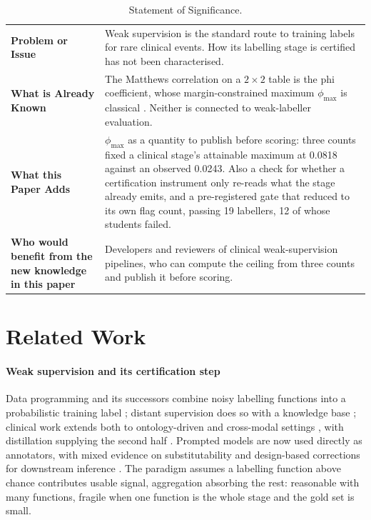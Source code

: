 \documentclass[review]{elsarticle}
\begin{document}
\begin{table}[H]
\centering
\caption{Statement of Significance.}
\label{tab:significance}
\footnotesize
\begin{tabular}{@{}p{}p{}@{}}
\hline
\textbf{Problem or Issue} & Weak supervision is the standard route to training labels for rare clinical events. How its labelling stage is certified has not been characterised. \\[4pt]

\textbf{What is Already Known} & The Matthews correlation on a $2\times2$ table is the phi coefficient, whose margin-constrained maximum $\phi_{\max}$ is classical \cite{cureton1959phimax,guilford1965phi}. Neither is connected to weak-labeller evaluation. \\[4pt]

\textbf{What this Paper Adds} & $\phi_{\max}$ as a quantity to publish before scoring: three counts fixed a clinical stage's attainable maximum at 0.0818 against an observed 0.0243. Also a check for whether a certification instrument only re-reads what the stage already emits, and a pre-registered gate that reduced to its own flag count, passing 19 labellers, 12 of whose students failed. \\[4pt]

\textbf{Who would benefit from the new knowledge in this paper} & Developers and reviewers of clinical weak-supervision pipelines, who can compute the ceiling from three counts and publish it before scoring. \\
\hline
\end{tabular}
\end{table}

\section{Related Work}
\label{sec:related}

\paragraph{Weak supervision and its certification step}
Data programming and its successors combine noisy labelling functions into a
probabilistic training label
\cite{ratner2016dataprogramming,ratner2017snorkel,zhang2022wssurvey}; distant
supervision does so with a knowledge base \cite{mintz2009distant}; clinical work
extends both to ontology-driven and cross-modal settings
\cite{fries2021trove,dunnmon2020crossmodal}, with distillation supplying the
second half \cite{hinton2015distilling}. Prompted models are now used directly as
annotators, with mixed evidence on substitutability
\cite{gilardi2023chatgpt,pangakis2023validation} and design-based corrections
for downstream inference \cite{egami2023surrogates}. The paradigm assumes a labelling
function above chance contributes usable signal, aggregation absorbing the rest:
reasonable with many functions, fragile when one function is the whole stage
and the gold set is small.
\end{document}
